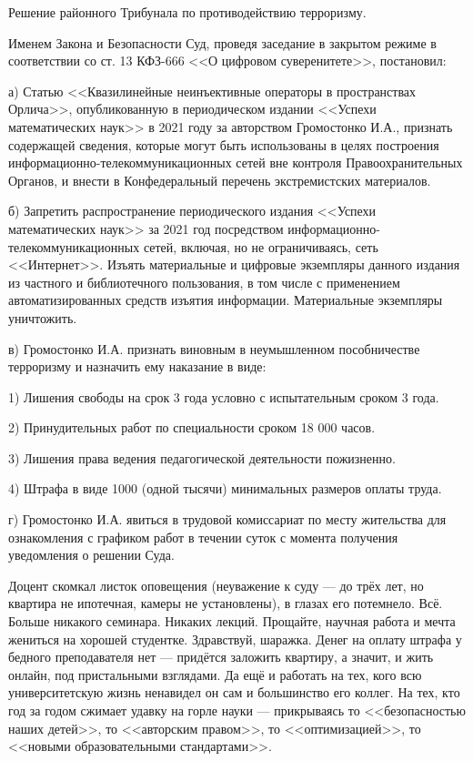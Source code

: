 Решение районного Трибунала по противодействию терроризму.

Именем Закона и Безопасности Суд,
проведя заседание в закрытом режиме в соответствии со ст. 13 КФЗ-666 <<О цифровом суверенитете>>, постановил:

а) Статью <<Квазилинейные неинъективные операторы в пространствах Орлича>>,
опубликованную в периодическом издании <<Успехи математических наук>> в 2021 году за авторством Громостонко И.А.,
признать содержащей сведения,
которые могут быть использованы в целях построения информационно-телекоммуникационных сетей вне контроля
Правоохранительных Органов, и внести в Конфедеральный перечень экстремистских материалов.

б) Запретить распространение периодического издания <<Успехи математических наук>>
за 2021 год посредством информационно-телекомму\-никаци\-онных сетей, включая, но не ограничиваясь, сеть <<Интернет>>.
Изъять материальные и цифровые экземпляры данного издания из частного и библиотечного пользования,
в том числе с применением автоматизированных средств изъятия информации. Материальные экземпляры уничтожить.

в) Громостонко И.А. признать виновным в неумышленном пособничестве терроризму и назначить ему наказание в виде:

1) Лишения свободы на срок 3 года условно с испытательным сроком 3 года.

2) Принудительных работ по специальности сроком 18 000 часов.

3) Лишения права ведения педагогической деятельности пожизненно.

4) Штрафа в виде 1000 (одной тысячи) минимальных размеров оплаты труда.

г) Громостонко И.А. явиться в трудовой комиссариат по месту жительства
для ознакомления с графиком работ в течении суток с момента получения уведомления о решении Суда.

\emptypar

Доцент скомкал листок оповещения (неуважение к суду --- до трёх лет, но квартира не ипотечная, камеры не установлены),
в глазах его потемнело. Всё. Больше никакого семинара. Никаких лекций.
Прощайте, научная работа и мечта жениться на хорошей студентке. Здравствуй, шаражка.
Денег на оплату штрафа у бедного преподавателя нет --- придётся заложить квартиру, а значит, и жить онлайн,
под пристальными взглядами. Да ещё и работать на тех, кого всю университетскую жизнь ненавидел он сам и большинство его коллег.
На тех, кто год за годом сжимает удавку на горле науки --- прикрываясь то <<безопасностью наших детей>>,
то <<авторским правом>>, то <<оптимизацией>>, то <<новыми образовательными стандартами>>.

